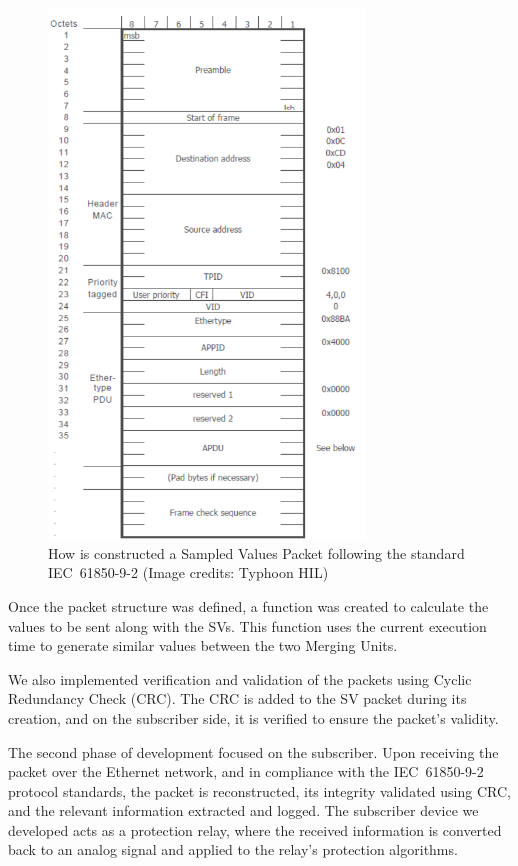\begin{figure}[tbh]
	\centering
	\includegraphics[width=0.75\textwidth, keepaspectratio]{ch4/assets/SV_Packtes.png} %
	\caption{How is constructed a Sampled Values Packet following the standard IEC~61850-9-2 (Image credits: Typhoon HIL)}
	\label{fig:sv_packet}
\end{figure}
\FloatBarrier


Once the packet structure was defined, a function was created to calculate the values to be sent along with the SVs. This function uses the current execution time to generate similar values between the two Merging Units.

We also implemented verification and validation of the packets using Cyclic Redundancy Check (CRC). The CRC is added to the SV packet during its creation, and on the subscriber side, it is verified to ensure the packet's validity.

The second phase of development focused on the subscriber. Upon receiving the packet over the Ethernet network, and in compliance with the IEC~61850-9-2 protocol standards, the packet is reconstructed, its integrity validated using CRC, and the relevant information extracted and logged. The subscriber device we developed acts as a protection relay, where the received information is converted back to an analog signal and applied to the relay’s protection algorithms.

